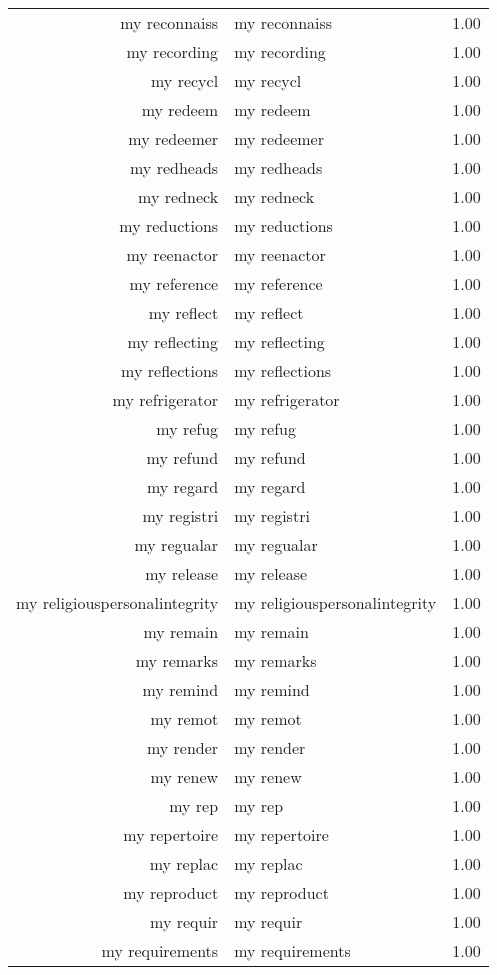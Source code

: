 \begin{table}[ht]
\begin{tabular}{rlr}
  my reconnaiss & my reconnaiss & 1.00 \\ 
  my recording & my recording & 1.00 \\ 
  my recycl & my recycl & 1.00 \\ 
  my redeem & my redeem & 1.00 \\ 
  my redeemer & my redeemer & 1.00 \\ 
  my redheads & my redheads & 1.00 \\ 
  my redneck & my redneck & 1.00 \\ 
  my reductions & my reductions & 1.00 \\ 
  my reenactor & my reenactor & 1.00 \\ 
  my reference & my reference & 1.00 \\ 
  my reflect & my reflect & 1.00 \\ 
  my reflecting & my reflecting & 1.00 \\ 
  my reflections & my reflections & 1.00 \\ 
  my refrigerator & my refrigerator & 1.00 \\ 
  my refug & my refug & 1.00 \\ 
  my refund & my refund & 1.00 \\ 
  my regard & my regard & 1.00 \\ 
  my registri & my registri & 1.00 \\ 
  my regualar & my regualar & 1.00 \\ 
  my release & my release & 1.00 \\ 
  my religiouspersonalintegrity & my religiouspersonalintegrity & 1.00 \\ 
  my remain & my remain & 1.00 \\ 
  my remarks & my remarks & 1.00 \\ 
  my remind & my remind & 1.00 \\ 
  my remot & my remot & 1.00 \\ 
  my render & my render & 1.00 \\ 
  my renew & my renew & 1.00 \\ 
  my rep & my rep & 1.00 \\ 
  my repertoire & my repertoire & 1.00 \\ 
  my replac & my replac & 1.00 \\ 
  my reproduct & my reproduct & 1.00 \\ 
  my requir & my requir & 1.00 \\ 
  my requirements & my requirements & 1.00 \\ 

\end{tabular}
\end{table}
